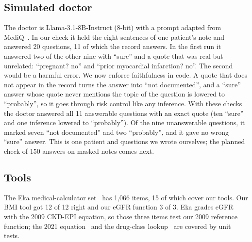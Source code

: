 \documentclass[10pt,a4paper,twocolumn]{article}
\begin{document}
\subsection{Simulated doctor}\label{sec:doctor}
The doctor is Llama-3.1-8B-Instruct (8-bit) with a prompt adapted from MediQ~\cite{mediq}. In our check it held the eight sentences of one patient's note and answered 20 questions, 11 of which the record answers. In the first run it answered two of the other nine with ``sure'' and a quote that was real but unrelated: ``pregnant? no'' and ``prior myocardial infarction? no''. The second would be a harmful error. We now enforce faithfulness in code. A quote that does not appear in the record turns the answer into ``not documented'', and a ``sure'' answer whose quote never mentions the topic of the question is lowered to ``probably'', so it goes through risk control like any inference. With these checks the doctor answered all 11 answerable questions with an exact quote (ten ``sure'' and one inference lowered to ``probably''). Of the nine unanswerable questions, it marked seven ``not documented'' and two ``probably'', and it gave no wrong ``sure'' answer. This is one patient and questions we wrote ourselves; the planned check of 150 answers on masked notes comes next.

\subsection{Tools}
The Eka medical-calculator set~\cite{ekacalc} has 1{,}066 items, 15 of which cover our tools. Our BMI tool got 12 of 12 right and our eGFR function 3 of 3. Eka grades eGFR with the 2009 CKD-EPI equation, so those three items test our 2009 reference function; the 2021 equation~\cite{ckdepi} and the drug-class lookup~\cite{rxnav} are covered by unit tests.

\end{document}
